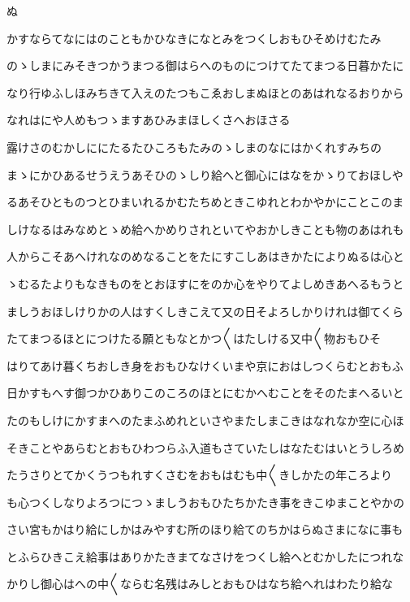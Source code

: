 \documentclass[a4paper,11pt,landscape]{ltjtarticle}
\begin{document}
ぬ
\par\medskip
かすならてなにはのこともかひなきになとみをつくしおもひそめけむたみ
\par\medskip
のゝしまにみそきつかうまつる御はらへのものにつけてたてまつる日暮かたに
\par\medskip
なり行ゆふしほみちきて入えのたつもこゑおしまぬほとのあはれなるおりから
\par\medskip
なれはにや人めもつゝますあひみまほしくさへおほさる
\par\medskip
露けさのむかしににたるたひころもたみのゝしまのなにはかくれすみちの
\par\medskip
まゝにかひあるせうえうあそひのゝしり給へと御心にはなをかゝりておほしや
\par\medskip
るあそひとものつとひまいれるかむたちめときこゆれとわかやかにことこのま
\par\medskip
しけなるはみなめとゝめ給へかめりされといてやおかしきことも物のあはれも
\par\medskip
人からこそあへけれなのめなることをたにすこしあはきかたによりぬるは心と
\par\medskip
ゝむるたよりもなきものをとおほすにをのか心をやりてよしめきあへるもうと
\par\medskip
ましうおほしけりかの人はすくしきこえて又の日そよろしかりけれは御てくら
\par\medskip
たてまつるほとにつけたる願ともなとかつ〱はたしける又中〱物おもひそ
\par\medskip
はりてあけ暮くちおしき身をおもひなけくいまや京におはしつくらむとおもふ
\par\medskip
日かすもへす御つかひありこのころのほとにむかへむことをそのたまへるいと
\par\medskip
たのもしけにかすまへのたまふめれといさやまたしまこきはなれなか空に心ほ
\par\medskip
そきことやあらむとおもひわつらふ入道もさていたしはなたむはいとうしろめ
\par\medskip
たうさりとてかくうつもれすくさむをおもはむも中〱きしかたの年ころより
\par\medskip
も心つくしなりよろつにつゝましうおもひたちかたき事をきこゆまことやかの
\par\medskip
さい宮もかはり給にしかはみやすむ所のほり給てのちかはらぬさまになに事も
\par\medskip
とふらひきこえ給事はありかたきまてなさけをつくし給へとむかしたにつれな
\par\medskip
かりし御心はへの中〱ならむ名残はみしとおもひはなち給へれはわたり給な
\par\medskip
\end{document}
